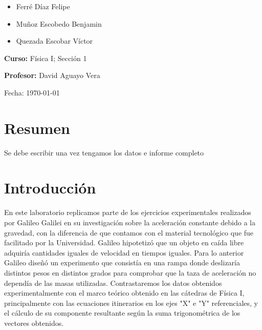 \documentclass[twocolumn,12pt]{article}
\begin{document}
\begin{titlepage}
\begin{flushleft}
			\begin{itemize}
				\item Ferré Díaz Felipe
				\item Muñoz Escobedo Benjamin 
                \item Quezada Escobar Víctor
			\end{itemize}
			
			\vspace{0.2in}
			
			\large
			\textbf{Curso:} Física I; Sección 1
			
			\vspace{0.2in}
			
			\large
			\textbf{Profesor:} David Aguayo Vera
		\end{flushleft}
		
		\vspace{0.2in}
		
		\begin{flushright}
			\Large
			Fecha: \today %
		\end{flushright}
		
		
		
		\vspace{1in}
	\end{titlepage}
	
	\section{Resumen}
	Se debe escribir una vez tengamos los datos e informe completo
	
	\section{Introducción}
	En este laboratorio replicamos parte de los ejercicios experimentales realizados por Galileo Galilei en su investigación sobre la aceleración constante debido a la gravedad, con la diferencia de que contamos con el material tecnológico que fue facilitado por la Universidad. Galileo hipotetizó que un objeto en caída libre adquiría cantidades iguales de velocidad en tiempos iguales. Para lo anterior Galileo diseñó un experimento que consistía en una rampa donde deslizaría distintos pesos en distintos grados para comprobar que la taza de aceleración no dependía de las masas utilizadas. Contrastaremos los datos obtenidos experimentalmente con el marco teórico obtenido en las cátedras de Física I, principalmente con las ecuaciones itinerarios en los ejes "X" e "Y" referenciales, y el cálculo de su componente resultante según la suma trigonométrica de los vectores obtenidos.
		
\end{document}
